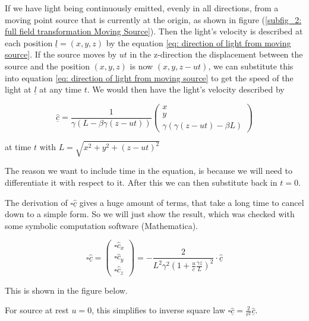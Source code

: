 

If we have light being continuously emitted, evenly in all directions, from a moving point source that is currently at the origin, as shown in figure (\ref{subfig_2: full field transformation Moving Source}).
Then the light's velocity is described at each position $\underline{l}=(x,y,z)$ by the equation \eqref{eq: direction of light from moving source}.
If the source moves by $ut$ in the z-direction the displacement between the source and the position $(x,y,z)$ is now $(x,y,z-ut)$, we can substitute this into equation \eqref{eq: direction of light from moving source} to get the speed of the light at $\underline{l}$ at any time $t$.
We would then have the light's velocity described by

\begin{equation}
	\underline{\hat{c}} = \frac{1}{ \gamma \left( L - \beta \gamma (z-ut) \right) }
	\begin{pmatrix}
		x \\
		y \\
		\gamma \left(\gamma (z-ut) - \beta L \right)
	\end{pmatrix}
\end{equation}

at time $t$ with $L=\sqrt{x^2 + y^2 + (z-ut)^2}$

The reason we want to include time in the equation, is because we will need to differentiate it with respect to it.
After this we can then substitute back in $t=0$.

The derivation of $\square\underline{\hat{c}}$ gives a huge amount of terms, that take a long time to cancel down to a simple form.
So we will just show the result, which was checked with some symbolic computation software (Mathematica).

\begin{equation}
	\square \underline{\hat{c}} =
	\begin{pmatrix}
		\square \hat{c}_x \\
		\square \hat{c}_y \\
		\square \hat{c}_z
	\end{pmatrix}
	=
	- \frac{2}{L^2\gamma^2\left( 1 + \frac{u}{c} \frac{\gamma z}{L} \right)^2} \cdot \underline{\hat{c}}
\end{equation}

This is shown in the figure below.

For source at rest $u=0$, this simplifies to inverse square law $\square \underline{\hat{c}} =\frac{2}{r^2}\underline{\hat{c}}$.

